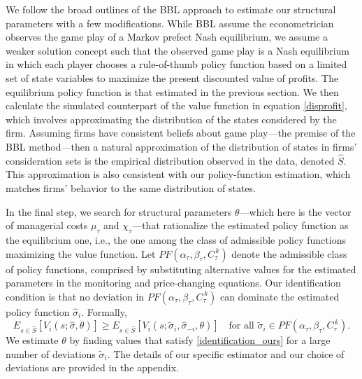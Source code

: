 \documentclass[11pt]{article}
\newcommand{\cut}[1]{C_{\tau}^{\,#1}}
\begin{document}
\begin{spacing}{1.3}
We follow the broad outlines of the BBL approach to estimate our
structural parameters with a few modifications.  While BBL assume the
econometrician observes the game play of a Markov prefect Nash
equilibrium, we assume a weaker solution concept such that the
observed game play is a Nash equilibrium in which each player chooses
a rule-of-thumb policy function based on a limited set of state
variables to maximize the present discounted value of profits. The
equilibrium policy function is that estimated in the previous section.
We then calculate the simulated counterpart of the value function in
equation \eqref{disprofit}, which involves approximating the
distribution of the states considered by the firm. Assuming firms have
consistent beliefs about game play---the premise of the BBL
method---then a natural approximation of the distribution of states in
firms' consideration sets is the empirical distribution observed in
the data, denoted $\hat{S}$. This approximation is also consistent
with our policy-function estimation, which matches firms' behavior to
the same distribution of states.

In the final step, we search for structural parameters
$\theta$---which here is the vector of managerial costs $\mu_\tau$ and
$\chi_\tau$---that rationalize the estimated policy function as the
equilibrium one, i.e., the one among the class of admissible policy
functions maximizing the value function.  Let
$PF(\alpha_{\tau},\beta_{\tau},\cut{k})$ denote the admissible class
of policy functions, comprised by substituting alternative values for
the estimated parameters in the monitoring and price-changing
equations.  Our identification condition is that no deviation in
$PF(\alpha_{\tau},\beta_{\tau},\cut{k})$ can dominate the estimated
policy function $\hat{\sigma}_{i}$. Formally,
\begin{equation}
\label{identification_ours}
 E_{s\in\hat{S}} [ V_{i}(s;\hat{\sigma},\theta )] \geq E_{s\in\hat{S}}
 [V_i(s;\tilde{\sigma}_i, \hat{\sigma}_{-i}, \theta )] \quad \text{for
   all $\tilde{\sigma}_i \in PF(\alpha_{\tau},\beta_{\tau},\cut{k})$}.
\end{equation}
We estimate $\theta$ by finding values that satisfy
\eqref{identification_ours} for a large number of deviations
$\tilde{\sigma}_i$. The details of our specific estimator and our
choice of deviations are provided in the appendix.


\end{spacing}
\end{document}
